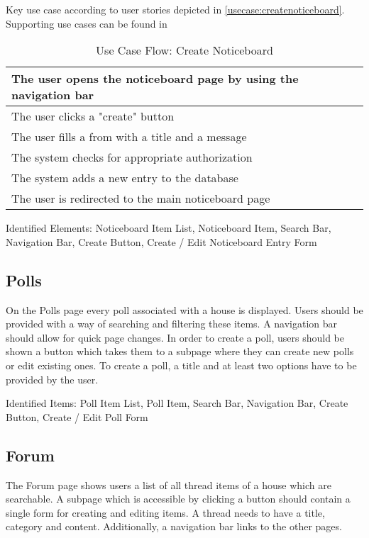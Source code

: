 Key use case according to user stories depicted in \autoref{usecase:createnoticeboard}. Supporting use cases can be found in \
\begin{table}[H]
    \begin{tabularx}{\linewidth}{|X|}
      \hline
       The user opens the noticeboard page by using the navigation bar \\
       \hline
       The user clicks a "create" button \\
       \hline
       The user fills a from with a title and a message \\
       \hline
       The system checks for appropriate authorization \\
       \hline
       The system adds a new entry to the database \\
       \hline
       The user is redirected to the main noticeboard page \\
       \hline 
    \end{tabularx}
    \caption{Use Case Flow: Create Noticeboard}
    \label{usecase:createnoticeboard}
  \end{table}
  
Identified Elements: Noticeboard Item List, Noticeboard Item, Search Bar, Navigation Bar, Create Button, Create / Edit Noticeboard Entry Form

\subsection{Polls}
On the Polls page every poll associated with a house is displayed. Users should be provided with a way of searching and filtering these items. A navigation bar should allow for quick page changes. In order to create a poll, users should be shown a button which takes them to a subpage where they can create new polls or edit existing ones. To create a poll, a title and at least two options have to be provided by the user.

Identified Items: Poll Item List, Poll Item, Search Bar, Navigation Bar, Create Button, Create / Edit Poll Form

\subsection{Forum}
The Forum page shows users a list of all thread items of a house which are searchable. A subpage which is accessible by clicking a button should contain a single form for creating and editing items. A thread needs to have a title, category and content. Additionally, a navigation bar links to the other pages.

